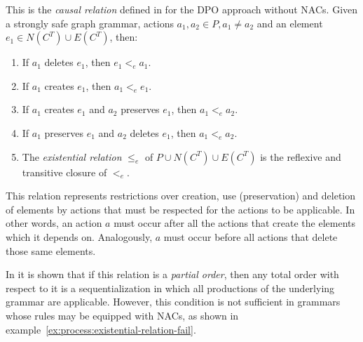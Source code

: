 \begin{definition} This is the \emph{causal relation} defined in \cite{Corradini1996} for the DPO approach without NACs. Given  \doublyTypedGraphGrammarCore{} a strongly safe graph grammar, actions \mbox{$a_1, a_2 \in P, a_1 \ne a_2$} and an element \mbox{$e_1 \in N(C^T) \cup E(C^T)$}, then:

  \begin{enumerate}
    \item If $a_1$ deletes $e_1$, then $e_1 <_e a_1$.
    \item If $a_1$ creates $e_1$, then $a_1 <_e e_1$.
    \item If $a_1$ creates $e_1$ and $a_2$ preserves $e_1$, then $a_1 <_e a_2$.
    \item If $a_1$ preserves $e_1$ and $a_2$ deletes $e_1$, then $a_1 <_e a_2$. 
    \item The \emph{existential relation} $\leq_e$ of $P \cup N(C^T) \cup E(C^T)$ is the reflexive and transitive closure of $<_e$.
  \end{enumerate}
\end{definition}

This relation represents restrictions over creation, use (preservation) and deletion of elements by actions that must be respected for the actions to be applicable. In other words, an action $a$ must occur after all the actions that create the elements which it depends on. Analogously, $a$ must occur before all actions that delete those same elements.

In \cite{Corradini1996} it is shown that if this relation is a \emph{partial order}, then any total order with respect to it is a sequentialization in which all productions of the underlying grammar are applicable. However, this condition is not sufficient in grammars whose rules may be equipped with NACs, as shown in example~\ref{ex:process:existential-relation-fail}.

